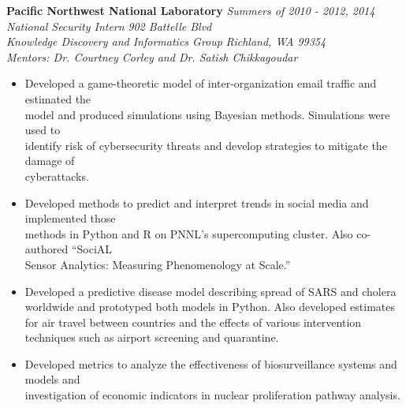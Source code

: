 \documentclass[11pt]{article}
\newenvironment{changemargin}[2]{%
  \begin{list}{}{%
    \setlength{\topsep}{0pt}%
    \setlength{\leftmargin}{#1}%
    \setlength{\rightmargin}{#2}%
    \setlength{\listparindent}{\parindent}%
    \setlength{\itemindent}{\parindent}%
    \setlength{\parsep}{\parskip}%
  }%
  \item[]}{\end{list}
}
\newenvironment{body} {
	\vspace*{-16pt}
	\begin{changemargin}{-0.25in}{-0.5in}
  }	
	{\end{changemargin}
}
\begin{document}
\begin{body}
	\textbf{Pacific Northwest National Laboratory}  \hfill \emph{Summers of 2010 - 2012, 2014}\\
	\emph{National Security Intern}
	\hfill \emph{902 Battelle Blvd}\\ 
	\emph{Knowledge Discovery and Informatics Group}
	\hfill \emph{Richland, WA 99354}\\
	\emph{Mentors: Dr. Courtney Corley and Dr. Satish Chikkagoudar}
	\vspace*{-4pt}
	\begin{itemize} \itemsep -0pt  %
\item Developed a game-theoretic model of inter-organization email traffic and estimated the\\ model and produced simulations using Bayesian methods. Simulations were used to\\ identify risk of cybersecurity threats and develop strategies to mitigate the damage of\\ cyberattacks.
\item Developed methods to predict and interpret trends in social media and implemented those\\ methods in Python and R on PNNL's supercomputing cluster. Also co-authored ``SociAL\\ Sensor Analytics: Measuring Phenomenology at Scale.''
\item Developed a predictive disease model describing spread of SARS and cholera worldwide and prototyped both models in Python. Also developed estimates for air travel between countries and the effects of various intervention techniques such as airport screening and quarantine.
\item Developed metrics to analyze the effectiveness of biosurveillance systems and models and\\ investigation of economic indicators in nuclear proliferation pathway analysis.
	\end{itemize}

				
\end{body}
\vspace{-9pt}
\smallskip

\pagebreak
\end{document}
